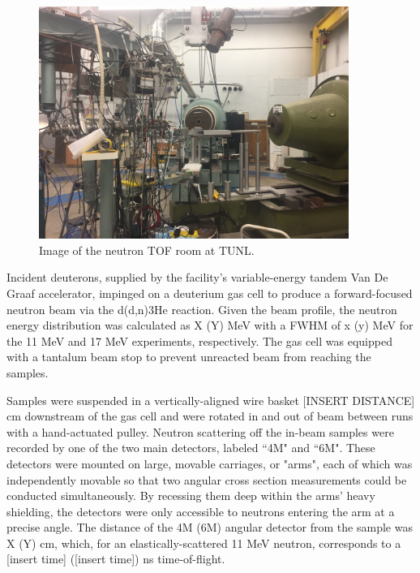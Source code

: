 \begin{figure}
  \begin{center}
\includegraphics[width = 0.9\textwidth]{figures/TOFRoomPhoto.jpg}
\caption{Image of the neutron TOF room at TUNL.} 
\label{TOFRoomPhoto}
\end{center}
\end{figure}

Incident deuterons, supplied by the facility's variable-energy tandem
    Van De Graaf accelerator, impinged on a deuterium gas cell to produce a
forward-focused neutron beam via the d(d,n)3He reaction. Given the beam profile,
    the neutron energy distribution was calculated as X (Y) MeV with a FWHM of x (y)
    MeV for the 11 MeV and 17 MeV experiments, respectively. The gas cell was
    equipped with a tantalum beam stop to prevent unreacted beam from reaching
    the samples. 

    Samples were suspended in a vertically-aligned wire basket [INSERT DISTANCE] cm
    downstream of the gas cell and were rotated in and out of beam between
    runs with a hand-actuated pulley. Neutron scattering off
    the in-beam samples were recorded by one of the two main detectors, labeled ``4M"
    and ``6M". These detectors were mounted on large, movable carriages, or "arms",
    each of which was independently movable so that two angular cross section
    measurements could be conducted simultaneously. By recessing them deep within
    the arms' heavy shielding, the detectors were only accessible to neutrons
    entering the arm at a precise angle. The distance of the 4M (6M) angular
    detector from the sample was X (Y) cm, which, for an elastically-scattered
    11 MeV neutron, corresponds to a [insert time] ([insert time]) ns time-of-flight.

